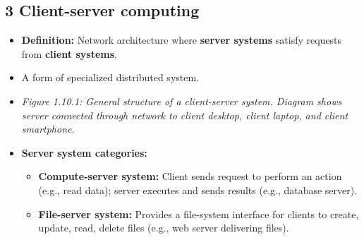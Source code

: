 \documentclass{article}
\begin{document}
\subsection*{3 Client-server computing}
\begin{itemize}
    \item \textbf{Definition:} Network architecture where \textbf{server systems} satisfy requests from \textbf{client systems}.
    \item A form of specialized distributed system.
    \item \textit{Figure 1.10.1: General structure of a client-server system. Diagram shows server connected through network to client desktop, client laptop, and client smartphone.}
    \item \textbf{Server system categories:}
    \begin{itemize}
        \item \textbf{Compute-server system:} Client sends request to perform an action (e.g., read data); server executes and sends results (e.g., database server).
        \item \textbf{File-server system:} Provides a file-system interface for clients to create, update, read, delete files (e.g., web server delivering files).
    \end{itemize}
\end{itemize}
\end{document}

